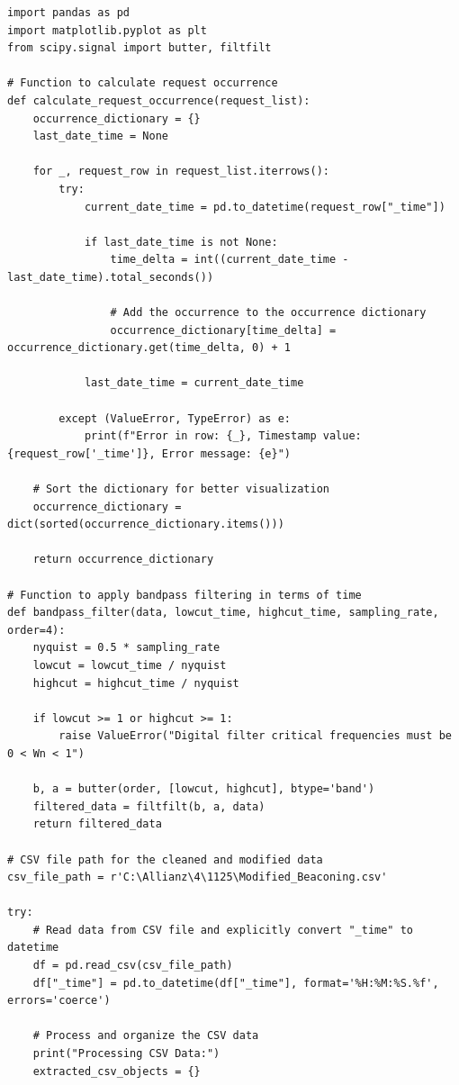 \begin{lstlisting}
import pandas as pd
import matplotlib.pyplot as plt
from scipy.signal import butter, filtfilt

# Function to calculate request occurrence
def calculate_request_occurrence(request_list):
    occurrence_dictionary = {}
    last_date_time = None

    for _, request_row in request_list.iterrows():
        try:
            current_date_time = pd.to_datetime(request_row["_time"])

            if last_date_time is not None:
                time_delta = int((current_date_time - last_date_time).total_seconds())

                # Add the occurrence to the occurrence dictionary
                occurrence_dictionary[time_delta] = occurrence_dictionary.get(time_delta, 0) + 1

            last_date_time = current_date_time

        except (ValueError, TypeError) as e:
            print(f"Error in row: {_}, Timestamp value: {request_row['_time']}, Error message: {e}")

    # Sort the dictionary for better visualization
    occurrence_dictionary = dict(sorted(occurrence_dictionary.items()))

    return occurrence_dictionary

# Function to apply bandpass filtering in terms of time
def bandpass_filter(data, lowcut_time, highcut_time, sampling_rate, order=4):
    nyquist = 0.5 * sampling_rate
    lowcut = lowcut_time / nyquist
    highcut = highcut_time / nyquist

    if lowcut >= 1 or highcut >= 1:
        raise ValueError("Digital filter critical frequencies must be 0 < Wn < 1")

    b, a = butter(order, [lowcut, highcut], btype='band')
    filtered_data = filtfilt(b, a, data)
    return filtered_data

# CSV file path for the cleaned and modified data
csv_file_path = r'C:\Allianz\4\1125\Modified_Beaconing.csv'

try:
    # Read data from CSV file and explicitly convert "_time" to datetime
    df = pd.read_csv(csv_file_path)
    df["_time"] = pd.to_datetime(df["_time"], format='%H:%M:%S.%f', errors='coerce')

    # Process and organize the CSV data
    print("Processing CSV Data:")
    extracted_csv_objects = {}


\end{lstlisting}
